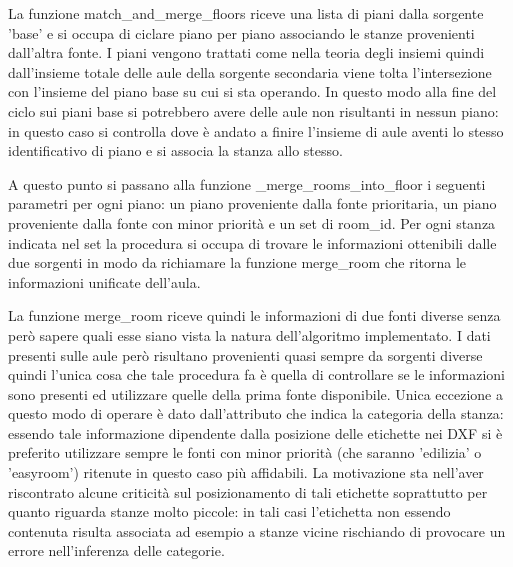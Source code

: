 \documentclass[12pt]{report}
\begin{document}
La funzione match\_and\_merge\_floors riceve una lista di piani dalla sorgente 'base' e si occupa di ciclare piano per piano associando le stanze provenienti dall'altra fonte. I piani vengono trattati come nella teoria degli insiemi quindi dall'insieme totale delle aule della sorgente secondaria viene tolta l'intersezione con l'insieme del piano base su cui si sta operando. In questo modo alla fine del ciclo sui piani base si potrebbero avere delle aule non risultanti in nessun piano: in questo caso si controlla dove è andato a finire l'insieme di aule aventi lo stesso identificativo di piano e si associa la stanza allo stesso.

A questo punto si passano alla funzione \_merge\_rooms\_into\_floor i seguenti parametri per ogni piano: un piano proveniente dalla fonte prioritaria, un piano proveniente dalla fonte con minor priorità e un set di room\_id.
Per ogni stanza indicata nel set la procedura si occupa di trovare le informazioni ottenibili dalle due sorgenti in modo da richiamare la funzione merge\_room che ritorna le informazioni unificate dell'aula.

La funzione merge\_room riceve quindi le informazioni di due fonti diverse senza però sapere quali esse siano vista la natura dell'algoritmo implementato.
I dati presenti sulle aule però risultano provenienti quasi sempre da sorgenti diverse quindi l'unica cosa che tale procedura fa è quella di controllare se le informazioni sono presenti ed utilizzare quelle della prima fonte disponibile.
Unica eccezione a questo modo di operare è dato dall'attributo che indica la categoria della stanza: essendo tale informazione dipendente dalla posizione delle etichette nei DXF si è preferito utilizzare sempre le fonti con minor priorità (che saranno 'edilizia' o 'easyroom') ritenute in questo caso più affidabili.
La motivazione sta nell'aver riscontrato alcune criticità sul posizionamento di tali etichette soprattutto per quanto riguarda stanze molto piccole: in tali casi l'etichetta non essendo contenuta risulta associata ad esempio a stanze vicine rischiando di provocare un errore nell'inferenza delle categorie.

\vspace{5mm} %
\end{document}
